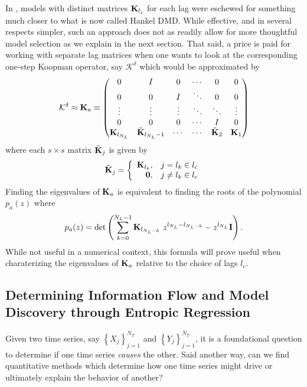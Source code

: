 \documentclass[a4paper,11pt]{article}
\newcommand{\ba}{\begin{array}}
\newcommand{\ea}{\end{array}}
\begin{document}
In \cite{clainche}, models with distinct matrices ${\bf K}_{l_{j}}$ for each lag were eschewed for something much closer to what is now called Hankel DMD.  While effective, and in several respects simpler, such an approach does not as readily allow for more thoughtful model selection as we explain in the next section.  That said, a price is paid for working with separate lag matrices when one wants to look at the corresponding one-step Koopman operator, say $\mathcal{K}^{\delta}$ which would be approximated by
\begin{equation}
\mathcal{K}^{\delta} \approx {\bf K}_{a} \equiv 
\begin{pmatrix} 
0 & I & 0 & \cdots & 0 & 0 \\ 
0 & 0 & I & \ddots & 0 & 0 \\ 
\vdots & \vdots & \vdots & \ddots & \ddots & \vdots \\
0 & 0 & 0 & \cdots & I & 0 \\
{\bf K}_{l_{N_{L}}} & \tilde{{\bf K}}_{l_{N_{L}}-1} & \cdots & \cdots & \tilde{{\bf K}}_{2} & {\bf K}_{1} 
\end{pmatrix}
\label{full_matrix}
\end{equation}
where each $s\times s$ matrix $\tilde{{\bf K}}_{j}$ is given by 
\[
\tilde{{\bf K}}_{j} = \left\{
\ba{rl}  
{\bf K}_{l_{k}}, & j=l_{k}\in l_{c}\\
{\bf 0}, & j\neq l_{k}\in l_{c}
\ea
\right.
\]
Finding the eigenvalues of ${\bf K}_{a}$ is equivalent to finding the roots of the polynomial $p_{a}(z)$ where 
\begin{equation}
p_{a}(z) = \text{det}\left(\sum_{k=0}^{N_{L}-1}{\bf K}_{l_{N_{L}-k}}~z^{l_{N_{L}}-l_{N_{L}-k}} - z^{l_{N_{L}}}{\bf I} \right). 
\label{characpoly}
\end{equation}
While not useful in a numerical context, this formula will prove useful when charaterizing the eigenvalues of ${\bf K}_{a}$ relative to the choice of lags $l_{c}$.  

\subsection{Determining Information Flow and Model Discovery through Entropic Regression}

Given two time series, say $\left\{X_{j}\right\}_{j=1}^{N_{T}}$ and $\left\{Y_{j}\right\}_{j=1}^{N_{T}}$, it is a foundational question to determine if one time series {\it causes} the other.  Said another way, can we find quantitative methods which determine how one time series might drive or ultimately explain the behavior of another?  
\end{document}
